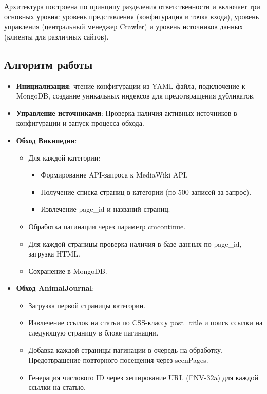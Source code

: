 \documentclass[a4paper,12pt]{article}
\begin{document}
Архитектура построена по принципу разделения ответственности и включает три основных уровня: уровень представления (конфигурация и точка входа), уровень управления (центральный менеджер Crawler) и уровень источников данных (клиенты для различных сайтов).

\subsection{Алгоритм работы}
\begin{itemize}
    \item \textbf{Инициализация}: чтение конфигурации из YAML файла, подключение к MongoDB, создание уникальных индексов для предотвращения дубликатов.
    \item \textbf{Управление источниками}: Проверка наличия активных источников в конфигурации и запуск процесса обхода.
    \item \textbf{Обход Википедии}:
    \begin{itemize}
        \item Для каждой категории:
        \begin{itemize}
            \item Формирование API-запроса к MediaWiki API.
            \item Получение списка страниц в категории (по 500 записей за запрос).
            \item Извлечение page\_id и названий страниц.
        \end{itemize}
        \item Обработка пагинации через параметр cmcontinue.
        \item Для каждой страницы проверка наличия в базе данных по page\_id, загрузка HTML.
        \item Сохранение в MongoDB.
    \end{itemize}
    \item \textbf{Обход AnimalJournal}:
    \begin{itemize}
            \item Загрузка первой страницы категории.
            \item Извлечение ссылок на статьи по CSS-классу post\_title и поиск ссылки на следующую страницу в блоке пагинации.
            \item Добавка каждой страницы пагинации в очередь на обработку. Предотвращение повторного посещения через seenPages.
            \item Генерация числового ID через хеширование URL (FNV-32a) для каждой ссылки на статью.

\end{itemize}
\end{itemize}
\end{document}
